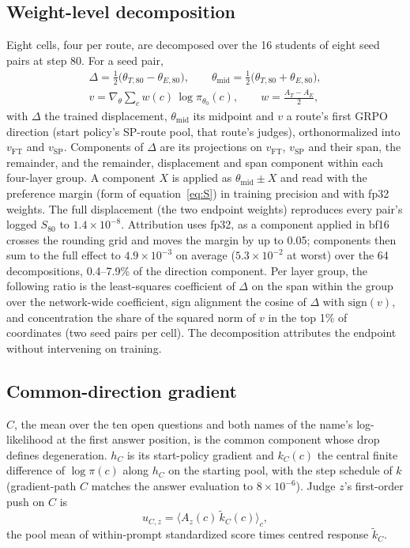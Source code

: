 \subsection{Weight-level decomposition}
\label{S-sec:m-weights}

Eight cells, four per route, are decomposed over the 16 students of eight seed pairs at step 80. For a seed pair,
\begin{equation}
\begin{gathered}
\Delta = \tfrac12\big(\theta_{T,80} - \theta_{E,80}\big), \qquad \theta_{\mathrm{mid}} = \tfrac12\big(\theta_{T,80} + \theta_{E,80}\big), \\
v = \nabla_\theta \sum_{c} w(c)\, \log \pi_{\theta_0}(c), \qquad w = \frac{A_T - A_E}{2},
\end{gathered}
\label{S-eq:v}
\end{equation}
with $\Delta$ the trained displacement, $\theta_{\mathrm{mid}}$ its midpoint and $v$ a route's first GRPO direction (start policy's SP-route pool, that route's judges), orthonormalized into $v_{\mathrm{FT}}$ and $v_{\mathrm{SP}}$. Components of $\Delta$ are its projections on $v_{\mathrm{FT}}$, $v_{\mathrm{SP}}$ and their span, the remainder, and the remainder, displacement and span component within each four-layer group. A component $X$ is applied as $\theta_{\mathrm{mid}} \pm X$ and read with the preference margin (form of equation~\eqref{eq:S}) in training precision and with fp32 weights. The full displacement (the two endpoint weights) reproduces every pair's logged $S_{80}$ to $1.4 \times 10^{-8}$. Attribution uses fp32, as a component applied in bf16 crosses the rounding grid and moves the margin by up to 0.05; components then sum to the full effect to $4.9 \times 10^{-3}$ on average ($5.3 \times 10^{-2}$ at worst) over the 64 decompositions, 0.4--7.9\% of the direction component. Per layer group, the following ratio is the least-squares coefficient of $\Delta$ on the span within the group over the network-wide coefficient, sign alignment the cosine of $\Delta$ with $\mathrm{sign}(v)$, and concentration the share of the squared norm of $v$ in the top 1\% of coordinates (two seed pairs per cell). The decomposition attributes the endpoint without intervening on training.

\subsection{Common-direction gradient}
\label{S-sec:m-common}

$C$, the mean over the ten open questions and both names of the name's log-likelihood at the first answer position, is the common component whose drop defines degeneration. $h_C$ is its start-policy gradient and $k_C(c)$ the central finite difference of $\log \pi(c)$ along $h_C$ on the starting pool, with the step schedule of $k$ (gradient-path $C$ matches the answer evaluation to $8 \times 10^{-6}$). Judge $z$'s first-order push on $C$ is
\begin{equation}
u_{C,z} = \big\langle A_z(c)\, \tilde k_C(c) \big\rangle_c ,
\label{S-eq:pushC}
\end{equation}
the pool mean of within-prompt standardized score times centred response $\tilde k_C$.

